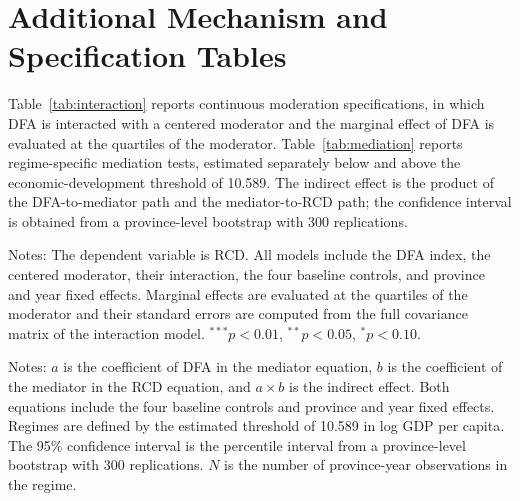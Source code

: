 \documentclass[economies,article,submit]{Definitions/mdpi}
\begin{document}
\section{Additional Mechanism and Specification Tables}\label{app:mechanisms}

Table~\ref{tab:interaction} reports continuous moderation specifications, in which DFA is interacted with a centered moderator and the marginal effect of DFA is evaluated at the quartiles of the moderator. Table~\ref{tab:mediation} reports regime-specific mediation tests, estimated separately below and above the economic-development threshold of 10.589. The indirect effect is the product of the DFA-to-mediator path and the mediator-to-RCD path; the confidence interval is obtained from a province-level bootstrap with 300 replications.

\begin{table}[H]
\caption{Continuous moderation of the DFA--RCD association.}\label{tab:interaction}
\begin{threeparttable}
\small

\begin{tablenotes}
\small
\item Notes: The dependent variable is RCD. All models include the DFA index, the centered moderator, their interaction, the four baseline controls, and province and year fixed effects. Marginal effects are evaluated at the quartiles of the moderator and their standard errors are computed from the full covariance matrix of the interaction model. $^{***}p<0.01$, $^{**}p<0.05$, $^{*}p<0.10$.
\end{tablenotes}
\end{threeparttable}
\end{table}

\begin{table}[H]
\caption{Regime-specific mediation tests.}\label{tab:mediation}
\begin{threeparttable}
\small

\begin{tablenotes}
\small
\item Notes: $a$ is the coefficient of DFA in the mediator equation, $b$ is the coefficient of the mediator in the RCD equation, and $a\times b$ is the indirect effect. Both equations include the four baseline controls and province and year fixed effects. Regimes are defined by the estimated threshold of 10.589 in log GDP per capita. The 95\% confidence interval is the percentile interval from a province-level bootstrap with 300 replications. $N$ is the number of province-year observations in the regime.
\end{tablenotes}
\end{threeparttable}
\end{table}


\end{document}
